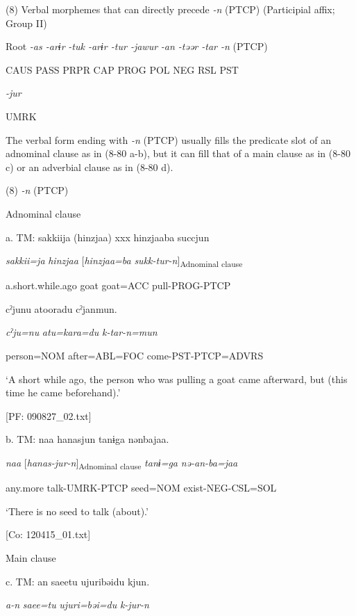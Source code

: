 (8)  Verbal morphemes that can directly precede \textit{{}-n} (PTCP) (Participial affix; Group II)

  Root  \textit{{}-as  {}-arɨr} %
\textit{{}-tuk  {}-arɨr  {}-tur  {}-jawur} %
\textit{{}-an  {}-təər  {}-tar  {}-n} (PTCP)

    CAUS  PASS  PRPR  CAP  PROG  POL  NEG  RSL  PST  

          \textit{{}-jur} 

          UMRK    

The verbal form ending with \textit{{}-n} (PTCP) usually fills the predicate slot of an adnominal clause as in (8-80 a-b), but it can fill that of a main clause as in (8-80 c) or an adverbial clause as in (8-80 d).

(8)  \textit{{}-n} (PTCP)

  Adnominal clause

  a.  TM:  sakkiija  (hinzjaa)  xxx  hinzjaaba  succjun

      \textit{sakkii=ja}  \textit{hinzjaa}    [\textit{hinzjaa=ba}  \textit{sukk-tur-n}]\textsubscript{Adnominal clause}

      a.short.while.ago  goat    goat=ACC  pull-PROG-PTCP

      cˀjunu  atooradu  cˀjanmun.

      \textit{cˀju=nu}  \textit{atu=kara=du}  \textit{k-tar-n=mun}

      person=NOM  after=ABL=FOC  come-PST-PTCP=ADVRS

      ‘A short while ago, the person who was pulling a goat came afterward, but (this time he came beforehand).’

      [PF: 090827\_02.txt]

  b.  TM:  naa  hanasjun  tanɨga  nənbajaa.

      \textit{naa}  [\textit{hanas-jur-n}]\textsubscript{Adnominal clause}  \textit{tanɨ=ga}  \textit{nə-an-ba=jaa}

      any.more  talk-UMRK-PTCP  seed=NOM  exist-NEG-CSL=SOL

      ‘There is no seed to talk (about).’

      [Co: 120415\_01.txt]

  Main clause

  c.  TM:  an  saeetu  ujuribəidu  kjun.

      \textit{a-n}  \textit{saee=tu}  \textit{ujuri=bəi=du}  \textit{k-jur-n}

